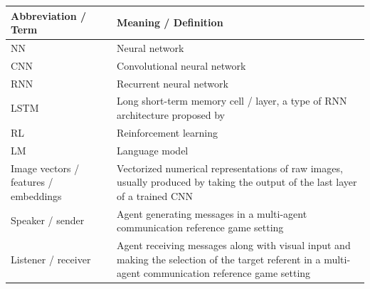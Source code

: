 
\begin{table}[]
	\centering
	\begin{tabularx}{\textwidth}{|X|X|}
		\hline
		\textbf{Abbreviation / Term} & \textbf{Meaning / Definition}                                                                                                                          \\ \hline
		NN                           & Neural network                                                                                                                                         \\ \hline
		CNN                          & Convolutional neural network                                                                                                                           \\ \hline
		RNN                          & Recurrent neural network                                                                                                                               \\ \hline
		LSTM                         & Long short-term memory cell / layer, a type of RNN architecture proposed by \cite{hochreiter1997long}                                                                                                                         \\ \hline
		RL                           & Reinforcement learning                                                                                                                                 \\ \hline
		LM 						& Language model \parencite{jurafsky2000speech} \\ \hline
		Image vectors / features / embeddings & Vectorized numerical representations of raw images, usually produced by taking the output of the last layer of a trained CNN \\ \hline
		Speaker / sender             & Agent generating messages in a multi-agent communication reference game setting                                                                        \\ \hline
		Listener / receiver          & Agent receiving messages along with visual input and making the selection of the target referent in a multi-agent communication reference game setting \\ \hline
		

\end{tabularx}
\end{table}
